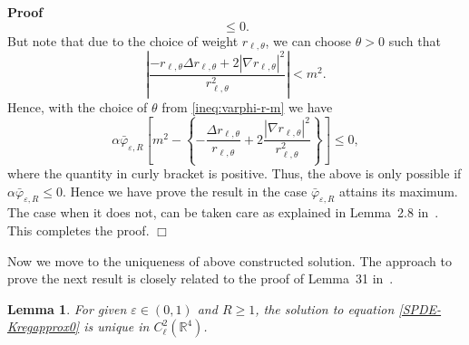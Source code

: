 \documentclass{article}
\newenvironment{proof}{\noindent\textbf{Proof\ }}{\hspace*{\fill}$\Box$\medskip}
\newtheorem{lemma}{Lemma}
\begin{document}
\begin{proof}
\begin{equation}
      \leqslant 0. \label{ineq:varphi-r-m}
  \end{equation}
  But note that due to the choice of weight $r_{\ell, \theta}$, we can choose
  $\theta > 0$ such that
  \[ \left| \frac{- r_{\ell, \theta} \Delta r_{\ell, \theta} + 2 | \nabla
     r_{\ell, \theta} |^2}{r_{\ell, \theta}^2} \right| < m^2 . \]
  Hence, with the choice of $\theta$ from \eqref{ineq:varphi-r-m} we have
  \[ \alpha \bar{\varphi}_{\varepsilon, R} \left[ m^2 - \left\{ - \frac{\Delta
     r_{\ell, \theta}}{r_{\ell, \theta}} + 2 \frac{| \nabla r_{\ell, \theta}
     |^2}{r_{\ell, \theta}^2} \right\} \right] \leqslant 0, \]
  where the quantity in curly bracket is positive. Thus, the above is only possible if $\alpha \bar{\varphi}_{\varepsilon, R} \leqslant 0$.  Hence
  we have prove the result in the case $\bar{\varphi}_{\varepsilon, R}$
  attains its maximum. The case when it does not, can be taken care as  explained in Lemma~2.8 in~{\cite{GH2019}}. This completes the proof. 
\end{proof}

Now we move to the uniqueness of above constructed solution. The approach to
prove the next result is closely related to the proof of Lemma~31
in~{\cite{AVG2021}}.

\begin{lemma}
  \label{lemma_exponentialuniqueness}For given $\varepsilon \in (0, 1)$ and $R
  \geqslant 1$, the solution to equation \eqref{SPDE-Kregapprox0} is unique in
  $C_{\ell}^2 (\mathbb{R}^4)$. 
\end{lemma}
\end{document}
